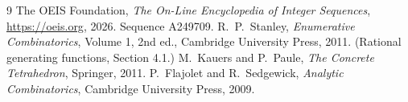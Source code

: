 \documentclass[11pt,a4paper]{article}
\theoremstyle{plain}
\theoremstyle{definition}
\begin{document}
\begin{thebibliography}{9}
 The OEIS Foundation, \emph{The On-Line Encyclopedia of Integer
Sequences}, \url{https://oeis.org}, 2026. Sequence A249709.
 R.~P.~Stanley, \emph{Enumerative Combinatorics}, Volume 1, 2nd ed.,
Cambridge University Press, 2011. (Rational generating functions, Section 4.1.)
 M.~Kauers and P.~Paule, \emph{The Concrete Tetrahedron}, Springer, 2011.
 P.~Flajolet and R.~Sedgewick, \emph{Analytic Combinatorics}, Cambridge
University Press, 2009.
\end{thebibliography}
\end{document}
